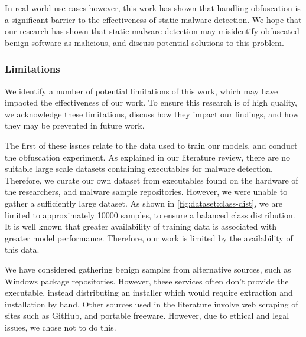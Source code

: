 \documentclass[conference,compsoc]{IEEEtran}
\begin{document}
In real world use-cases however, this work has shown that handling obfuscation is a significant barrier to the effectiveness of static malware detection. We hope that our research has shown that static malware detection may misidentify obfuscated benign software as malicious, and discuss potential solutions to this problem.

\subsubsection{Limitations}

We identify a number of potential limitations of this work, which may have impacted the effectiveness of our work. To ensure this research is of high quality, we acknowledge these limitations, discuss how they impact our findings, and how they may be prevented in future work. 

The first of these issues relate to the data used to train our models, and conduct the obfuscation experiment. As explained in our literature review, there are no suitable large scale datasets containing executables for malware detection. Therefore, we curate our own dataset from executables found on the hardware of the researchers, and malware sample repositories. However, we were unable to gather a sufficiently large dataset. As shown in \ref{fig:dataset:class-dist}, we are limited to approximately 10000 samples, to ensure a balanced class distribution. It is well known that greater availability of training data is associated with greater model performance. Therefore, our work is limited by the availability of this data. 

We have considered gathering benign samples from alternative sources, such as Windows package repositories. However, these services often don't provide the executable, instead distributing an installer which would require extraction and installation by hand. Other sources used in the literature involve web scraping of sites such as GitHub, and portable freeware. However, due to ethical and legal issues, we chose not to do this. 
\end{document}
